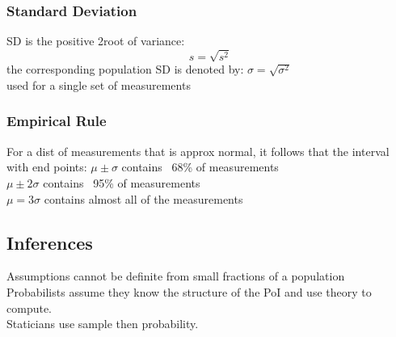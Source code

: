 \documentclass[12pt]{article}
\begin{document}
    \subsubsection{Standard Deviation}
        SD is the positive 2root of variance:
        \begin{equation}
            s=\sqrt{s^{2}}
        \end{equation}
        the corresponding population SD is denoted by:
        $ \sigma = \sqrt{\sigma ^2 }  $ \\
        used for a single set of measurements
    \subsubsection{Empirical Rule}
        For a dist of measurements that is approx normal, it follows that
        the interval with end points:
        $ \mu \pm \sigma  $ contains ~68\% of measurements\\
        $ \mu \pm 2\sigma  $ contains ~95\% of measurements \\
        $ \mu = 3\sigma  $ contains almost all of the measurements
\subsection{Inferences}
    Assumptions cannot be definite from small fractions of a population\\
    Probabilists assume they know the structure of the PoI
    and use theory to compute.\\
    Staticians use sample then probability.
\end{document}
